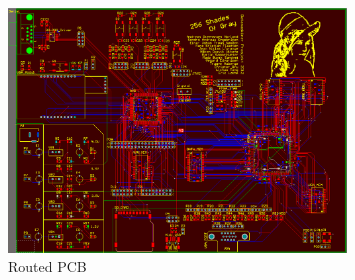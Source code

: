 \begin{figure}[h]
  \centering
  \includegraphics[width=0.8\textwidth]{fig/pcb/routing.PNG}
  \caption{Routed PCB}
  \label{fig:routed-pcb}
\end{figure}
